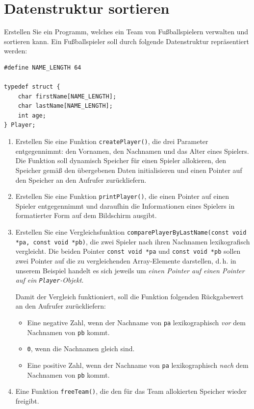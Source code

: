 \chapter{Datenstruktur sortieren}

\vspace{10pt}

Erstellen Sie ein Programm, welches ein Team von Fußballspielern verwalten und
sortieren kann. Ein Fußballspieler soll durch folgende Datenstruktur
repräsentiert werden:

\begin{verbatim}
#define NAME_LENGTH 64

typedef struct {
    char firstName[NAME_LENGTH];
    char lastName[NAME_LENGTH];
    int age;
} Player;
\end{verbatim}

\begin{enumerate}
  \item Erstellen Sie eine Funktion \texttt{createPlayer()}, die drei
  Parameter entgegennimmt: den Vornamen, den Nachnamen und das Alter eines
  Spielers. Die Funktion soll dynamisch Speicher für einen Spieler allokieren,
  den Speicher gemäß den übergebenen Daten initialisieren und einen Pointer auf
  den Speicher an den Aufrufer zurückliefern.
  \item Erstellen Sie eine Funktion \texttt{printPlayer()}, die einen
  Pointer auf einen Spieler entgegennimmt und daraufhin die Informationen eines
  Spielers in formatierter Form auf dem Bildschirm ausgibt.
  \item Erstellen Sie eine Vergleichsfunktion
  \texttt{comparePlayerByLastName(const void *pa, const void *pb)}, die
  zwei Spieler nach ihren Nachnamen lexikografisch vergleicht. Die beiden
  Pointer \texttt{const void *pa} und \texttt{const void *pb}
  sollen zwei Pointer auf die zu vergleichenden Array-Elemente darstellen,
  d.\,h. in unserem Beispiel handelt es sich jeweils um \textit{einen Pointer
  auf einen Pointer auf ein \texttt{Player}-Objekt}.

  Damit der Vergleich funktioniert, soll die Funktion folgenden Rückgabewert an
  den Aufrufer zurückliefern:
  \begin{itemize}
    \item Eine negative Zahl, wenn der Nachname von \texttt{pa}
    lexikographisch \textit{vor} dem Nachnamen von \texttt{pb} kommt.
    \item \texttt{0}, wenn die Nachnamen gleich sind.
    \item Eine positive Zahl, wenn der Nachname von \texttt{pa}
    lexikographisch \textit{nach} dem Nachnamen von \texttt{pb} kommt.
  \end{itemize}
  \item Eine Funktion \texttt{freeTeam()}, die den für das Team
  allokierten Speicher wieder freigibt.
\end{enumerate}

